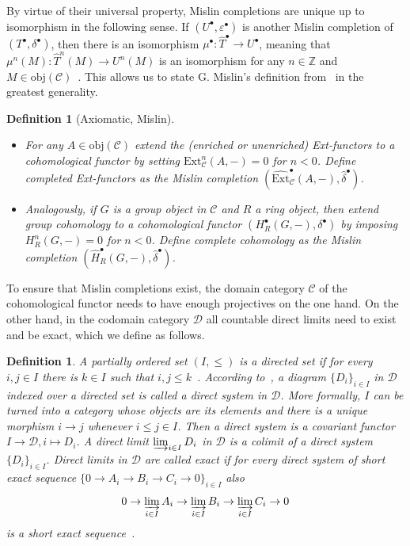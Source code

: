 \documentclass[12pt,a4paper]{article}
\numberwithin{equation}{section}
\newtheorem{defn}[thm]{Definition}
\theoremstyle{nonumberplain}
\begin{document}
By virtue of their universal property, Mislin completions are unique up to isomorphism in the following sense. If $(U^{\bullet}, \varepsilon^{\bullet})$ is another Mislin completion of $(T^{\bullet}, \delta^{\bullet})$, then there is an isomorphism $\mu^{\bullet}: \widehat{T}^{\bullet} \rightarrow U^{\bullet}$, meaning that $\mu^n(M): \widehat{T}^n(M) \rightarrow U^n(M)$ is an isomorphism for any $n \in \mathbb{Z}$ and $M \in \mathrm{obj}(\mathcal{C})$~\cite[p.~202]{kro95}. This allows us to state G.\! Mislin's definition from~\cite[p.~297]{mis94} in the greatest generality.

\begin{defn}[Axiomatic, Mislin]\label{defn:axiomatic}
${} \quad {}$
\begin{itemize}
\item For any $A \in \mathrm{obj}(\mathcal{C})$ extend the (enriched or unenriched) Ext-functors to a cohomological functor by setting $\mathrm{Ext}_{\mathcal{C}}^n(A, -) = 0$ for $n < 0$. Define completed Ext-functors as the Mislin completion $(\widehat{\mathrm{Ext}}_{\mathcal{C}}^{\bullet}(A, -), \widehat{\delta}^{\bullet})$.
\item Analogously, if $G$ is a group object in $\mathcal{C}$ and $R$ a ring object, then extend group cohomology to a cohomological functor $(H_R^{\bullet}(G, -), \delta^{\bullet})$ by imposing $H_R^n(G, -) = 0$ for $n < 0$. Define complete cohomology as the Mislin completion $(\widehat{H}_R^{\bullet}(G, -), \widehat{\delta}^{\bullet})$.
\end{itemize}
\end{defn}

To ensure that Mislin completions exist, the domain category $\mathcal{C}$ of the cohomological functor needs to have enough projectives on the one hand. On the other hand, in the codomain category $\mathcal{D}$ all countable direct limits need to exist and be exact, which we define as follows.

\begin{defn}\label{defn:directlimit}
A partially ordered set $(I, \leq)$ is a directed set if for every $i, j \in I$ there is $k \in I$ such that $i,j \leq k$~\cite[p.~1]{rib10}. According to~\cite[p.~14]{rib10}, a diagram $\lbrace D_i \rbrace_{i \in I}$ in $\mathcal{D}$ indexed over a directed set is called a direct system in $\mathcal{D}$. More formally, $I$ can be turned into a category whose objects are its elements and there is a unique morphism $i \rightarrow j$ whenever $i \leq j \in I$. Then a direct system is a covariant functor $I \rightarrow \mathcal{D}, i \mapsto D_i$. A direct limit $\varinjlim_{i \in I} D_i$ in $\mathcal{D}$ is a colimit of a direct system $\lbrace D_i \rbrace_{i \in I}$. Direct limits in $\mathcal{D}$ are called exact if for every direct system of short exact sequence $\lbrace 0 \rightarrow A_i \rightarrow B_i \rightarrow C_i \rightarrow 0 \rbrace_{i \in I}$ also
\[ 0 \rightarrow \varinjlim_{i \in I} A_i \rightarrow \varinjlim_{i \in I} B_i \rightarrow \varinjlim_{i \in I} C_i \rightarrow 0 \]
is a short exact sequence~\cite[\href{https://stacks.math.columbia.edu/tag/079A}{Tag 079A}]{stacks-project}.
\end{defn}
\end{document}
